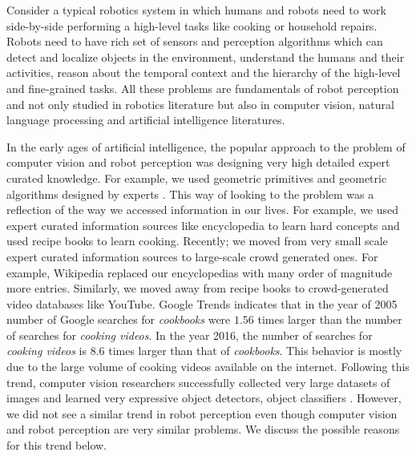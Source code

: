 
Consider a typical robotics system in which humans and robots need to work side-by-side performing a high-level tasks like cooking or household repairs. Robots need to have rich set of sensors and perception algorithms which can detect and localize objects in the environment, understand the humans and their activities, reason about the temporal context and the hierarchy of the high-level and fine-grained tasks. All these problems are fundamentals of robot perception and not only studied in robotics literature but also in computer vision, natural language processing and artificial intelligence literatures.

In the early ages of artificial intelligence, the popular approach to the problem of computer vision and robot perception was designing very high detailed expert curated knowledge. For example, we used geometric primitives and geometric algorithms designed by experts \cite{cylinder}. 
This way of looking to the problem was a reflection of the way we accessed information in our lives. For example, we used expert curated information sources like encyclopedia to learn hard concepts and used recipe books to learn cooking. Recently; we moved from very small scale expert curated information sources to large-scale crowd generated ones. For example, Wikipedia replaced our encyclopedias with many order of magnitude more entries. Similarly, we moved away from recipe books to crowd-generated video databases like YouTube\cite{youtube}. Google Trends\cite{google_trends} indicates that in the year of 2005 number of Google searches for \emph{cookbooks} were $1.56$ times larger than the number of searches for \emph{cooking videos}. In the year 2016, the number of searches for \emph{cooking videos} is $8.6$ times larger than that of \emph{cookbooks}. This behavior is mostly due to the large volume of cooking videos available on the internet. Following this trend, computer vision researchers successfully collected very large datasets of images and learned very expressive object detectors\cite{rcnn}, object classifiers \cite{alexnet,vggnet,googlenet,residual}. However, we did not see a similar trend in robot perception even though computer vision and robot perception are very similar problems. We discuss the possible reasons for this trend below.

